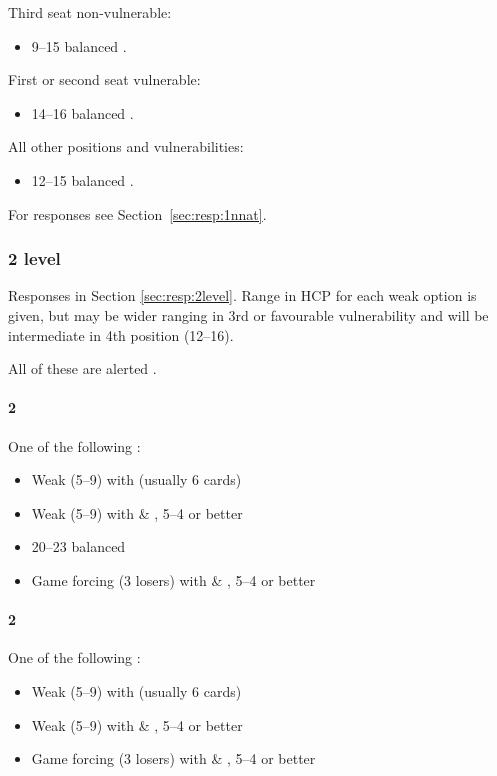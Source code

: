 Third seat non-vulnerable:
\begin{itemize}
	\item 9--15 balanced .
\end{itemize}

First or second seat vulnerable:
\begin{itemize}
\item 14--16 balanced .
\end{itemize}

All other positions and vulnerabilities:
\begin{itemize}
\item 12--15 balanced .
\end{itemize}

For responses see Section~\ref{sec:resp:1nnat}.

\newpage 

\subsubsection{2 level}
\label{sec:open:2level}

Responses in Section \ref{sec:resp:2level}. Range in HCP for each weak option
is given, but may be wider ranging in 3rd or favourable vulnerability and will
be intermediate in 4th position (12--16).

All of these are alerted .

\paragraph{2\clubs}
One of the following :
\begin{itemize}
\item Weak (5--9) with \diamonds (usually 6 cards)
\item Weak (5--9) with \hearts \& \spades, 5--4 or better
\item 20--23 balanced
\item Game forcing (3 losers) with \hearts \& \spades, 5--4 or better
\end{itemize}

\paragraph{2\diamonds}
One of the following :
\begin{itemize}
\item Weak (5--9) with \hearts (usually 6 cards)
\item Weak (5--9) with \spades \& \clubs, 5--4 or better 
\item Game forcing (3 losers) with \spades \& \clubs, 5--4 or better
\end{itemize}

